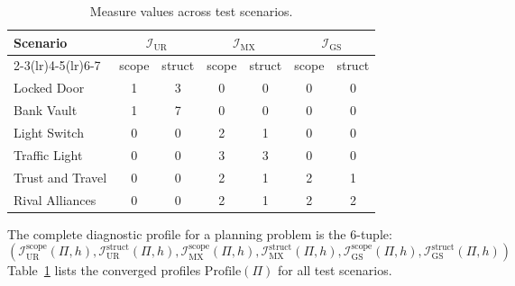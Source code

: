 \begin{table}[ht]
    \centering
    \begin{tabular}{l cc cc cc}
        \toprule
        Scenario         & \multicolumn{2}{c}{$\mathcal{I}_{\text{UR}}$} & \multicolumn{2}{c}{$\mathcal{I}_{\text{MX}}$} & \multicolumn{2}{c}{$\mathcal{I}_{\text{GS}}$}                           \\
        \cmidrule(lr){2-3}\cmidrule(lr){4-5}\cmidrule(lr){6-7}
                         & scope                                         & struct                                        & scope                                         & struct & scope & struct \\
        \midrule
        Locked Door      & 1                                             & 3                                             & 0                                             & 0      & 0     & 0      \\
        Bank Vault       & 1                                             & 7                                             & 0                                             & 0      & 0     & 0      \\
        Light Switch     & 0                                             & 0                                             & 2                                             & 1      & 0     & 0      \\
        Traffic Light    & 0                                             & 0                                             & 3                                             & 3      & 0     & 0      \\
        Trust and Travel & 0                                             & 0                                             & 2                                             & 1      & 2     & 1      \\
        Rival Alliances  & 0                                             & 0                                             & 2                                             & 1      & 2     & 2      \\
        \bottomrule
    \end{tabular}
    \caption{Measure values across test scenarios.}
    \label{tab:measure_values}
\end{table}

The complete diagnostic profile for a planning problem is the 6-tuple:
\begin{equation*}
    (\mathcal{I}^{\text{scope}}_{\text{UR}}(\Pi, h), \mathcal{I}^{\text{struct}}_{\text{UR}}(\Pi, h), \mathcal{I}^{\text{scope}}_{\text{MX}}(\Pi, h), \mathcal{I}^{\text{struct}}_{\text{MX}}(\Pi, h), \mathcal{I}^{\text{scope}}_{\text{GS}}(\Pi, h), \mathcal{I}^{\text{struct}}_{\text{GS}}(\Pi, h))
\end{equation*}
Table~\ref{tab:measure_values} lists the converged profiles $\text{Profile}(\Pi)$ for all test scenarios.

